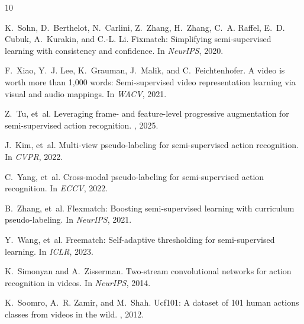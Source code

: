 \documentclass[10pt,twocolumn,a4paper]{article}
\begin{document}
\small
\begin{thebibliography}{10}\itemsep=-1pt

K.~Sohn, D.~Berthelot, N.~Carlini, Z.~Zhang, H.~Zhang, C.~A. Raffel, E.~D. Cubuk, A.~Kurakin, and C.-L. Li.
\newblock Fixmatch: Simplifying semi-supervised learning with consistency and confidence.
\newblock In {\em NeurIPS}, 2020.

F.~Xiao, Y.~J. Lee, K.~Grauman, J.~Malik, and C.~Feichtenhofer.
\newblock A video is worth more than 1,000 words: Semi-supervised video representation learning via visual and audio mappings.
\newblock In {\em WACV}, 2021.

Z.~Tu, et~al.
\newblock Leveraging frame- and feature-level progressive augmentation for semi-supervised action recognition.
, 2025.

J.~Kim, et~al.
\newblock Multi-view pseudo-labeling for semi-supervised action recognition.
\newblock In {\em CVPR}, 2022.

C.~Yang, et~al.
\newblock Cross-modal pseudo-labeling for semi-supervised action recognition.
\newblock In {\em ECCV}, 2022.

B.~Zhang, et~al.
\newblock Flexmatch: Boosting semi-supervised learning with curriculum pseudo-labeling.
\newblock In {\em NeurIPS}, 2021.

Y.~Wang, et~al.
\newblock Freematch: Self-adaptive thresholding for semi-supervised learning.
\newblock In {\em ICLR}, 2023.

K.~Simonyan and A.~Zisserman.
\newblock Two-stream convolutional networks for action recognition in videos.
\newblock In {\em NeurIPS}, 2014.

K.~Soomro, A.~R. Zamir, and M.~Shah.
\newblock Ucf101: A dataset of 101 human actions classes from videos in the wild.
, 2012.

\end{thebibliography}
\end{document}
